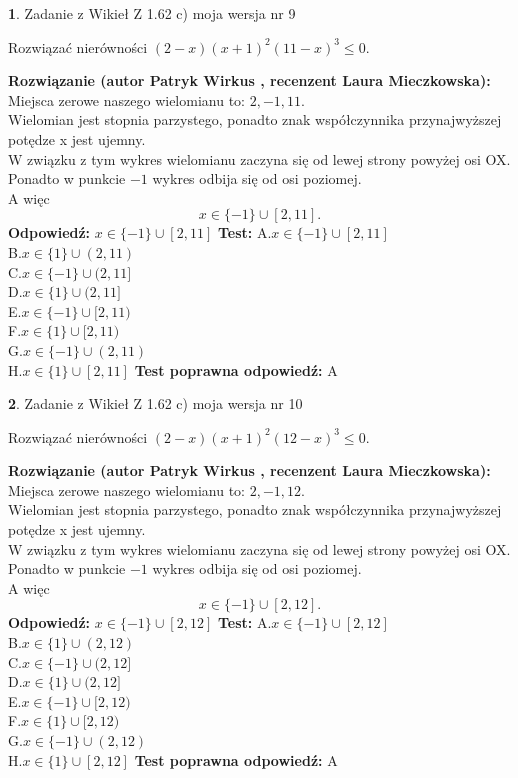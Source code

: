 \documentclass[12pt, a4paper]{article}
\theoremstyle{definition} %
\newtheorem{zad}{}
\newcommand{\zadStart}[1]{\begin{zad}#1\newline}
\newcommand{\zadStop}{\end{zad}}
\newcommand{\rozwStart}[2]{\noindent \textbf{Rozwiązanie (autor #1 , recenzent #2): }\newline}
\newcommand{\rozwStop}{\newline}
\newcommand{\odpStart}{\noindent \textbf{Odpowiedź:}\newline}
\newcommand{\odpStop}{\newline}
\newcommand{\testStart}{\noindent \textbf{Test:}\newline}
\newcommand{\testStop}{\newline}
\newcommand{\kluczStart}{\noindent \textbf{Test poprawna odpowiedź:}\newline}
\newcommand{\kluczStop}{\newline}
\begin{document}
\zadStart{Zadanie z Wikieł Z 1.62 c) moja wersja nr 9}

Rozwiązać nierówności $(2-x)(x+1)^{2}(11-x)^{3}\le0$.
\zadStop
\rozwStart{Patryk Wirkus}{Laura Mieczkowska}
Miejsca zerowe naszego wielomianu to: $2, -1, 11$.\\
Wielomian jest stopnia parzystego, ponadto znak współczynnika przy\linebreak najwyższej potędze x jest ujemny.\\ W związku z tym wykres wielomianu zaczyna się od lewej strony powyżej osi OX.\\
Ponadto w punkcie $-1$ wykres odbija się od osi poziomej.\\
A więc $$x \in \{-1\} \cup [2,11].$$
\rozwStop
\odpStart
$x \in \{-1\} \cup [2,11]$
\odpStop
\testStart
A.$x \in \{-1\} \cup [2,11]$\\
B.$x \in \{1\} \cup (2,11)$\\
C.$x \in \{-1\} \cup (2,11]$\\
D.$x \in \{1\} \cup (2,11]$\\
E.$x \in \{-1\} \cup [2,11)$\\
F.$x \in \{1\} \cup [2,11)$\\
G.$x \in \{-1\} \cup (2,11)$\\
H.$x \in \{1\} \cup [2,11]$
\testStop
\kluczStart
A
\kluczStop



\zadStart{Zadanie z Wikieł Z 1.62 c) moja wersja nr 10}

Rozwiązać nierówności $(2-x)(x+1)^{2}(12-x)^{3}\le0$.
\zadStop
\rozwStart{Patryk Wirkus}{Laura Mieczkowska}
Miejsca zerowe naszego wielomianu to: $2, -1, 12$.\\
Wielomian jest stopnia parzystego, ponadto znak współczynnika przy\linebreak najwyższej potędze x jest ujemny.\\ W związku z tym wykres wielomianu zaczyna się od lewej strony powyżej osi OX.\\
Ponadto w punkcie $-1$ wykres odbija się od osi poziomej.\\
A więc $$x \in \{-1\} \cup [2,12].$$
\rozwStop
\odpStart
$x \in \{-1\} \cup [2,12]$
\odpStop
\testStart
A.$x \in \{-1\} \cup [2,12]$\\
B.$x \in \{1\} \cup (2,12)$\\
C.$x \in \{-1\} \cup (2,12]$\\
D.$x \in \{1\} \cup (2,12]$\\
E.$x \in \{-1\} \cup [2,12)$\\
F.$x \in \{1\} \cup [2,12)$\\
G.$x \in \{-1\} \cup (2,12)$\\
H.$x \in \{1\} \cup [2,12]$
\testStop
\kluczStart
A
\kluczStop
\end{document}

